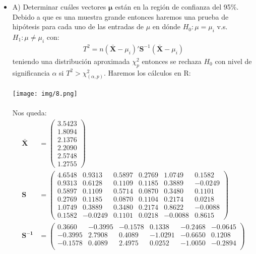 \begin{sol}
\begin{itemize}
\item A) Determinar cuáles vectores $\mathbf{\mu}$ están en la región de confianza del 95\%. \\
Debido a que es una muestra grande entonces haremos una prueba de hipótesis para cada uno de las entradas de $\mu$ en dónde $H_0 : \mu = \mu_i$ v.s. $H_1:\mu \neq \mu_i$ con: 
\begin{align*}
T^2 = n (\mathbf{\bar{X}} - \mu_i)' \mathbf{S}^{-1} (\mathbf{\bar{X}} - \mu_i)
\end{align*}
teniendo una distribución aproximada $\chi_p^2$ entonces se rechaza $H_0$ con nivel de significancia $\alpha$ si $T^2 > \chi_{(\alpha,p)}^2$. Haremos los cálculos en R:\\\\
\texttt{[image: img/8.png]}\\\\
Nos queda: 
\begin{align*}
\mathbf{\bar{X}} &=
\begin{pmatrix} 
  3.5423 \\ 
  1.8094 \\ 
  2.1376 \\ 
  2.2090 \\ 
  2.5748 \\ 
  1.2755 
\end{pmatrix} \\
\mathbf{S} &=
\begin{pmatrix}
  4.6548 &  0.9313 &  0.5897 &  0.2769 &  1.0749 &  0.1582 \\
  0.9313 &  0.6128 &  0.1109 &  0.1185 &  0.3889 & -0.0249 \\
  0.5897 &  0.1109 &  0.5714 &  0.0870 &  0.3480 &  0.1101 \\
  0.2769 &  0.1185 &  0.0870 &  0.1104 &  0.2174 &  0.0218 \\
  1.0749 &  0.3889 &  0.3480 &  0.2174 &  0.8622 & -0.0088 \\
  0.1582 & -0.0249 &  0.1101 &  0.0218 & -0.0088 &  0.8615
\end{pmatrix} \\
\mathbf{S^{-1}} &=
\begin{pmatrix}
  0.3660 & -0.3995 & -0.1578 &  0.1338 & -0.2468 & -0.0645 \\
 -0.3995 &  2.7908 &  0.4089 & -1.0291 & -0.6650 &  0.1208 \\
 -0.1578 &  0.4089 &  2.4975 &  0.0252 & -1.0050 & -0.2894 \\

\end{pmatrix}
\end{align*}
\end{itemize}
\end{sol}
